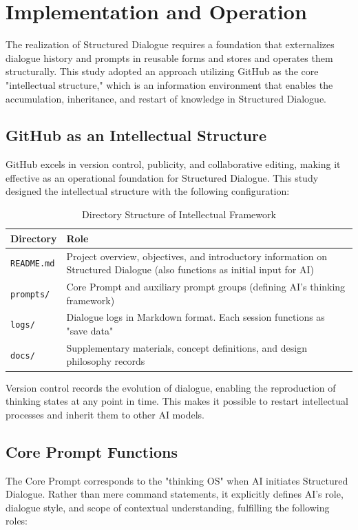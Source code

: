 \documentclass[11pt]{article}
\begin{document}
\section{Implementation and Operation}
The realization of Structured Dialogue requires a foundation that externalizes dialogue history and prompts in reusable forms and stores and operates them structurally. This study adopted an approach utilizing GitHub as the core "intellectual structure," which is an information environment that enables the accumulation, inheritance, and restart of knowledge in Structured Dialogue.
\subsection{GitHub as an Intellectual Structure}
GitHub excels in version control, publicity, and collaborative editing, making it effective as an operational foundation for Structured Dialogue. This study designed the intellectual structure with the following configuration:

\begin{table}[htbp]
\centering
\caption{Directory Structure of Intellectual Framework}
\begin{tabular}{p{3cm}|p{9cm}}
\hline
\textbf{Directory} & \textbf{Role} \\
\hline
\texttt{README.md} & Project overview, objectives, and introductory information on Structured Dialogue (also functions as initial input for AI) \\
\hline
\texttt{prompts/} & Core Prompt and auxiliary prompt groups (defining AI's thinking framework) \\
\hline
\texttt{logs/} & Dialogue logs in Markdown format. Each session functions as "save data" \\
\hline
\texttt{docs/} & Supplementary materials, concept definitions, and design philosophy records \\
\hline
\end{tabular}
\label{tab:directory-structure}
\end{table}

Version control records the evolution of dialogue, enabling the reproduction of thinking states at any point in time. This makes it possible to restart intellectual processes and inherit them to other AI models.
\subsection{Core Prompt Functions}
The Core Prompt corresponds to the "thinking OS" when AI initiates Structured Dialogue. Rather than mere command statements, it explicitly defines AI's role, dialogue style, and scope of contextual understanding, fulfilling the following roles:
\end{document}
